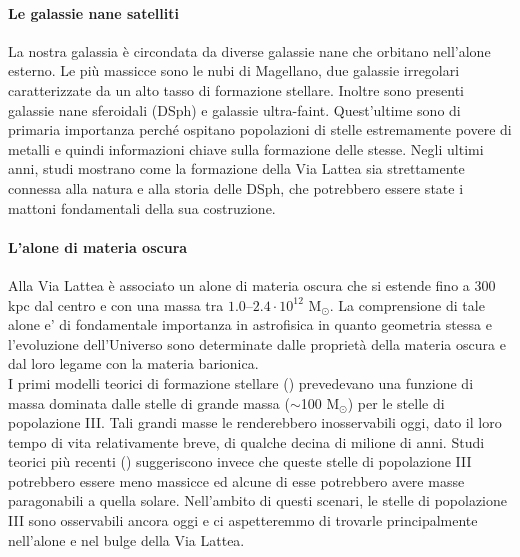 \documentclass[12pt]{article}
\begin{document}
\paragraph{Le galassie nane satelliti}

La nostra galassia è circondata da diverse galassie nane che orbitano nell’alone esterno. Le più massicce sono le nubi di Magellano, due galassie irregolari caratterizzate da un alto tasso di formazione stellare. Inoltre sono presenti galassie nane sferoidali (DSph) e galassie ultra-faint. Quest’ultime sono di primaria importanza perché ospitano popolazioni di stelle estremamente povere di metalli e quindi informazioni chiave sulla formazione delle stesse. Negli ultimi anni, studi mostrano come la formazione della Via Lattea sia strettamente connessa alla natura e alla storia delle DSph, che potrebbero essere state i mattoni fondamentali della sua costruzione. 


\paragraph{L'alone di materia oscura}

Alla Via Lattea è associato un alone di materia oscura che si estende fino a 300\,kpc dal centro e con una massa tra $1.0 – 2.4 \cdot 10^{12} $ M$_{\odot}$. 
La comprensione di tale alone e' di fondamentale importanza in astrofisica in quanto geometria stessa e l'evoluzione dell’Universo sono determinate dalle proprietà della materia oscura e dal loro legame con la materia barionica. \\

I primi modelli teorici di formazione stellare (\cite{Abel}) prevedevano una funzione di massa dominata dalle stelle di grande massa ($\sim$100 M$_{\odot}$) per le stelle di popolazione III. Tali grandi masse le renderebbero inosservabili oggi, dato il loro tempo di vita relativamente breve, di qualche decina di milione di anni.
Studi teorici più recenti (\cite{Stacy}) suggeriscono invece che queste stelle di popolazione III potrebbero essere meno massicce ed alcune di esse potrebbero avere masse paragonabili a quella solare. Nell'ambito di questi scenari, le stelle di popolazione III sono osservabili ancora oggi e ci aspetteremmo di trovarle  principalmente nell’alone e nel bulge della Via Lattea.
\end{document}
